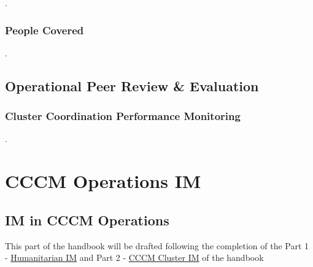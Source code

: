\documentclass[
  a4paper,
  onecolumn,
  oneside]{book}
\begin{document}
.

\hypertarget{people-covered}{%
\section{People Covered}\label{people-covered}}

.

\hypertarget{operational-peer-review-evaluation}{%
\chapter{Operational Peer Review \&
Evaluation}\label{operational-peer-review-evaluation}}

\hypertarget{cluster-coordination-performance-monitoring}{%
\section{Cluster Coordination Performance
Monitoring}\label{cluster-coordination-performance-monitoring}}

.

\part{CCCM Operations IM}

\hypertarget{im-in-cccm-operations}{%
\chapter{IM in CCCM Operations}\label{im-in-cccm-operations}}

This part of the handbook will be drafted following the completion of
the Part 1 -
\href{https://imhandbook.cccmcluster.org/part1/data-literacy.html}{Humanitarian
IM} and Part 2 -
\href{https://imhandbook.cccmcluster.org/part3/cluster.html}{CCCM
Cluster IM} of the handbook


\backmatter
\end{document}

